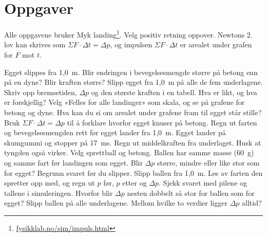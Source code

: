 \documentclass[11pt]{article}
\begin{document}

\section*{Oppgaver}

Alle oppgavene bruker Myk landing\footnote{\url{fysikklab.no/sim/impuls.html}}. Velg positiv retning oppover. Newtons 2. lov kan skrives som $ΣF \cdot Δt = Δp$, og impulsen $ΣF \cdot Δt$ er arealet under grafen for $F$ mot $t$.

\begin{oppgaveliste}
\oppgave {}Egget slippes fra 1,0~m. Blir endringen i bevegelsesmengde større på betong enn på en dyne? Blir kraften større?
\svar
\oppgave {}Slipp egget fra 1,0~m på alle de fem underlagene. Skriv opp bremsetiden, $Δp$ og den største kraften i en tabell. Hva er likt, og hva er forskjellig?
\svar
\oppgave {}Velg «Felles for alle landinger» som skala, og se på grafene for betong og dyne. Hva kan du si om arealet under grafene fram til egget står stille? Bruk $ΣF \cdot Δt = Δp$ til å forklare hvorfor egget knuser på betong.
\svar
\oppgave {}Regn ut farten og bevegelsesmengden rett før egget lander fra 1,0~m. Egget lander på skumgummi og stopper på 17~ms. Regn ut middelkraften fra underlaget. Husk at tyngden også virker.
\svar
\oppgave {}Velg sprettball og betong. Ballen har samme masse (60~g) og samme fart før landingen som egget. Blir $Δp$ større, mindre eller like stor som for egget? Begrunn svaret før du slipper.
\svar
\oppgave {}Slipp ballen fra 1,0~m. Les av farten den spretter opp med, og regn ut $p$ før, $p$ etter og $Δp$. Sjekk svaret med pilene og tallene i simuleringen.
\svar
\oppgave {}Hvorfor blir $Δp$ nesten dobbelt så stor for ballen som for egget? Slipp ballen på alle underlagene. Mellom hvilke to verdier ligger $Δp$ alltid?
\svar
\end{oppgaveliste}
\end{document}
